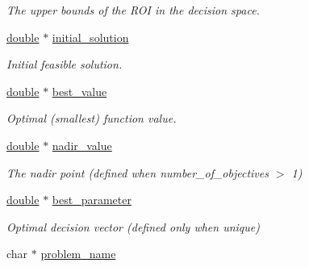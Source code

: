 \begin{DoxyCompactItemize}
\begin{DoxyCompactList}\small\item\em The upper bounds of the R\+OI in the decision space. \end{DoxyCompactList}\item 
\hyperlink{classdouble}{double} $\ast$ \hyperlink{structcoco__problem__s_ab67b86443f3303ea0214599fabdaaa41}{initial\+\_\+solution}\hypertarget{structcoco__problem__s_ab67b86443f3303ea0214599fabdaaa41}{}\label{structcoco__problem__s_ab67b86443f3303ea0214599fabdaaa41}

\begin{DoxyCompactList}\small\item\em Initial feasible solution. \end{DoxyCompactList}\item 
\hyperlink{classdouble}{double} $\ast$ \hyperlink{structcoco__problem__s_a22829d33483b97e54612d532e2ffef9d}{best\+\_\+value}\hypertarget{structcoco__problem__s_a22829d33483b97e54612d532e2ffef9d}{}\label{structcoco__problem__s_a22829d33483b97e54612d532e2ffef9d}

\begin{DoxyCompactList}\small\item\em Optimal (smallest) function value. \end{DoxyCompactList}\item 
\hyperlink{classdouble}{double} $\ast$ \hyperlink{structcoco__problem__s_aa6800aa8240a8baf6faba199505a1ae3}{nadir\+\_\+value}\hypertarget{structcoco__problem__s_aa6800aa8240a8baf6faba199505a1ae3}{}\label{structcoco__problem__s_aa6800aa8240a8baf6faba199505a1ae3}

\begin{DoxyCompactList}\small\item\em The nadir point (defined when number\+\_\+of\+\_\+objectives $>$ 1) \end{DoxyCompactList}\item 
\hyperlink{classdouble}{double} $\ast$ \hyperlink{structcoco__problem__s_a11f67fc5fbcc7ec1a31ff35d0bae7030}{best\+\_\+parameter}\hypertarget{structcoco__problem__s_a11f67fc5fbcc7ec1a31ff35d0bae7030}{}\label{structcoco__problem__s_a11f67fc5fbcc7ec1a31ff35d0bae7030}

\begin{DoxyCompactList}\small\item\em Optimal decision vector (defined only when unique) \end{DoxyCompactList}\item 
char $\ast$ \hyperlink{structcoco__problem__s_a8f29372c73424cf97df131fa61d950e0}{problem\+\_\+name}\hypertarget{structcoco__problem__s_a8f29372c73424cf97df131fa61d950e0}{}\label{structcoco__problem__s_a8f29372c73424cf97df131fa61d950e0}


\end{DoxyCompactItemize}
